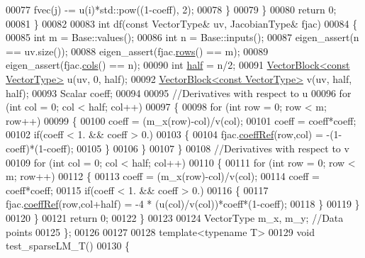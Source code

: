 \begin{DoxyCode}
00077           fvec(j) -= u(i)*std::pow((1-coeff), 2);
00078       \}
00079     \}
00080     \textcolor{keywordflow}{return} 0;
00081   \}
00082   
00083   \textcolor{keywordtype}{int} df(\textcolor{keyword}{const} VectorType& uv, JacobianType& fjac)
00084   \{
00085     \textcolor{keywordtype}{int} m = Base::values(); 
00086     \textcolor{keywordtype}{int} n = Base::inputs();
00087     eigen\_assert(n == uv.size());
00088     eigen\_assert(fjac.\hyperlink{group___sparse_core___module_a62e61bb861eee306d5b069ce652b5aa5}{rows}() == m);
00089     eigen\_assert(fjac.\hyperlink{group___sparse_core___module_aa391750e3c530227e4a5c3c52e959975}{cols}() == n);
00090     \textcolor{keywordtype}{int} \hyperlink{struct_eigen_1_1half}{half} = n/2;
00091     \hyperlink{group___core___module_class_eigen_1_1_vector_block}{VectorBlock<const VectorType>} u(uv, 0, half);
00092     \hyperlink{group___core___module_class_eigen_1_1_vector_block}{VectorBlock<const VectorType>} v(uv, half, half);
00093     Scalar coeff;
00094     
00095     \textcolor{comment}{//Derivatives with respect to u}
00096     \textcolor{keywordflow}{for} (\textcolor{keywordtype}{int} col = 0; col < half; col++)
00097     \{
00098       \textcolor{keywordflow}{for} (\textcolor{keywordtype}{int} row = 0; row < m; row++)
00099       \{
00100         coeff = (m\_x(row)-col)/v(col);
00101           coeff = coeff*coeff;
00102         \textcolor{keywordflow}{if}(coeff < 1. && coeff > 0.)
00103         \{
00104           fjac.\hyperlink{group___sparse_core___module_a013197b3f598968ff37ed8c97087f1ef}{coeffRef}(row,col) = -(1-coeff)*(1-coeff);
00105         \}
00106       \}
00107     \}
00108     \textcolor{comment}{//Derivatives with respect to v}
00109     \textcolor{keywordflow}{for} (\textcolor{keywordtype}{int} col = 0; col < half; col++)
00110     \{
00111       \textcolor{keywordflow}{for} (\textcolor{keywordtype}{int} row = 0; row < m; row++)
00112       \{
00113         coeff = (m\_x(row)-col)/v(col);
00114         coeff = coeff*coeff;
00115         \textcolor{keywordflow}{if}(coeff < 1. && coeff > 0.)
00116         \{
00117           fjac.\hyperlink{group___sparse_core___module_a013197b3f598968ff37ed8c97087f1ef}{coeffRef}(row,col+half) = -4 * (u(col)/v(col))*coeff*(1-coeff);
00118         \}
00119       \}
00120     \}
00121     \textcolor{keywordflow}{return} 0;
00122   \}
00123   
00124   VectorType m\_x, m\_y; \textcolor{comment}{//Data points}
00125 \};
00126 
00127 
00128 \textcolor{keyword}{template}<\textcolor{keyword}{typename} T>
00129 \textcolor{keywordtype}{void} test\_sparseLM\_T()
00130 \{

\end{DoxyCode}
